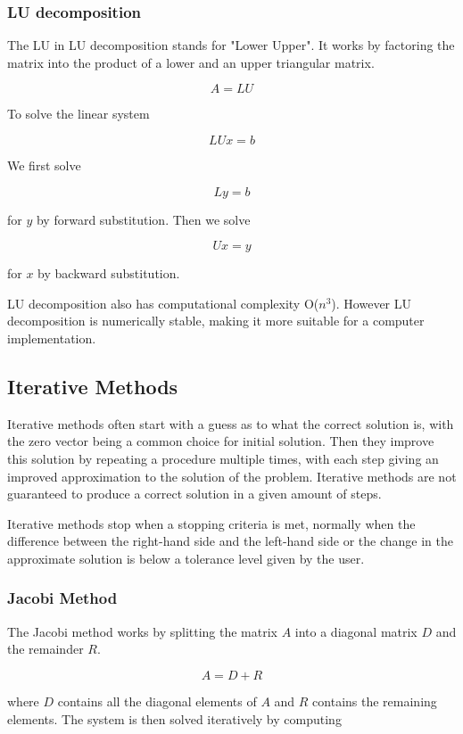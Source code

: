 \subsubsection*{LU decomposition}

The LU in LU decomposition stands for "Lower Upper". It works by factoring the 
matrix into the product of a lower and an upper triangular matrix. 

$$A = LU$$

To solve the linear system 

$$LUx = b$$

We first solve 

$$Ly = b$$

for $y$ by forward substitution. Then we solve 

$$Ux = y$$

for $x$ by backward substitution.

LU decomposition also has computational complexity O($n^3$). However LU decomposition 
is numerically stable, making it more suitable for a computer implementation.

\subsection*{Iterative Methods}

Iterative methods often start with a guess as to what the correct solution is, 
with the zero vector being a common choice for initial solution. Then they improve 
this solution by repeating a procedure multiple times, with each step 
giving an improved approximation to the solution of the problem. Iterative methods 
are not guaranteed to produce a correct solution in a given amount of steps. 

Iterative methods stop when a stopping criteria is met, normally when the difference 
between the right-hand side and the left-hand side or the change in the approximate 
solution is below a tolerance level given by the user. 

\subsubsection*{Jacobi Method}

The Jacobi method works by splitting the matrix $A$ into a diagonal matrix $D$ 
and the remainder $R$. 

$$A = D+R$$

where $D$ contains all the diagonal elements of $A$ and $R$ contains the remaining 
elements. The system is then solved iteratively by computing 

